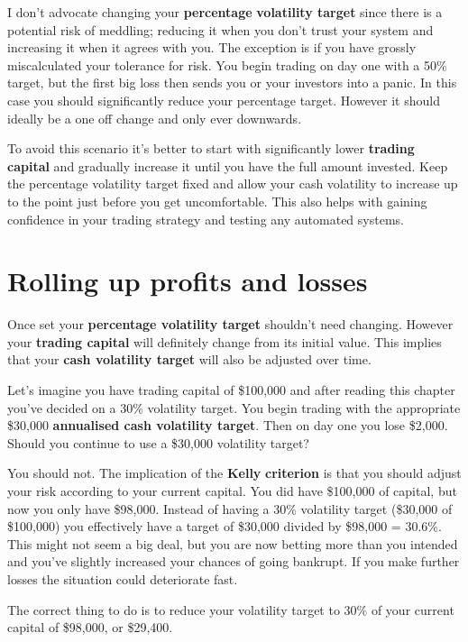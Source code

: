 I don’t advocate changing your \textbf{percentage} \textbf{volatility target} since there is a potential risk of meddling; reducing it when you don’t trust your system and increasing it when it agrees with you. The exception is if you have grossly miscalculated your tolerance for risk. You begin trading on day one with a 50\% target, but the first big loss then sends you or your investors into a panic. In this case you should significantly reduce your percentage target. However it should ideally be a one off change and only ever downwards.

To avoid this scenario it’s better to start with significantly lower \textbf{trading capital} and gradually increase it until you have the full amount invested. Keep the percentage volatility target fixed and allow your cash volatility to increase up to the point just before you get uncomfortable. This also helps with gaining confidence in your trading strategy and testing any automated systems.

\section*{Rolling up profits and losses}  {}

Once set your \textbf{percentage volatility target} shouldn't need changing. However your \textbf{trading capital} will definitely change from its initial value. This implies that your \textbf{cash volatility target} will also be adjusted over time.

Let's imagine you have trading capital of \$100,000 and after reading this chapter you've decided on a 30\% volatility target. You begin trading with the appropriate \$30,000 \textbf{annualised cash volatility target}. Then on day one you lose \$2,000. Should you continue to use a \$30,000 volatility target?

You should not. The implication of the \textbf{Kelly} \textbf{criterion} is that you should adjust your risk according to your current capital. You did have \$100,000 of capital, but now you only have \$98,000. Instead of having a 30\% volatility target (\$30,000 of \$100,000) you effectively have a target of \$30,000 divided by \$98,000 = 30.6\%. This might not seem a big deal, but you are now betting more than you intended and you've slightly increased your chances of going bankrupt. If you make further losses the situation could deteriorate fast.

The correct thing to do is to reduce your volatility target to 30\% of your current capital of \$98,000, or \$29,400.

